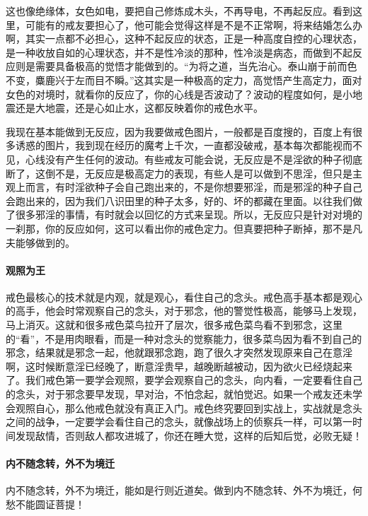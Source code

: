 这也像绝缘体，女色如电，要把自己修炼成木头，不再导电，不再起反应。看到这里，可能有的戒友要担心了，他可能会觉得这样是不是不正常啊，将来结婚怎么办啊，其实一点都不必担心，这种不起反应的状态，正是一种高度自控的心理状态，是一种收放自如的心理状态，并不是性冷淡的那种，性冷淡是病态，而做到不起反应则是需要具备极高的觉悟才能做到的。“为将之道，当先治心。泰山崩于前而色不变，麋鹿兴于左而目不瞬。”这其实是一种极高的定力，高觉悟产生高定力，面对女色的对境时，就看你的反应了，你的心线是否波动了？波动的程度如何，是小地震还是大地震，还是心如止水，这都反映着你的戒色水平。

我现在基本能做到无反应，因为我要做戒色图片，一般都是百度搜的，百度上有很多诱惑的图片，我到现在经历的魔考上千次，一直都没破戒，基本每次都能视而不见，心线没有产生任何的波动。有些戒友可能会说，无反应是不是淫欲的种子彻底断了，这倒不是，无反应是极高定力的表现，有些人是可以做到不思淫，但只是主观上而言，有时淫欲种子会自己跑出来的，不是你想要邪淫，而是邪淫的种子自己会跑出来的，因为我们八识田里的种子太多，好的、坏的都藏在里面。以往我们做了很多邪淫的事情，有时就会以回忆的方式来呈现。所以，无反应只是针对对境的一刹那，你的反应如何，这可以看出你的戒色定力。但真要把种子断掉，那不是凡夫能够做到的。

\paragraph{观照为王}

戒色最核心的技术就是内观，就是观心，看住自己的念头。戒色高手基本都是观心的高手，他会时常观察自己的念头，对于邪念，他的警觉性极高，能够马上发现，马上消灭。这就和很多戒色菜鸟拉开了层次，很多戒色菜鸟看不到邪念，这里的“看”，不是用肉眼看，而是一种对念头的觉察能力，很多菜鸟因为看不到自己的邪念，结果就是邪念一起，他就跟邪念跑，跑了很久才突然发现原来自己在意淫啊，这时候断意淫已经晚了，断意淫贵早，越晚断越被动，因为欲火已经烧起来了。我们戒色第一要学会观照，要学会观察自己的念头，向内看，一定要看住自己的念头，对于邪念要早发现，早对治，不怕念起，就怕觉迟。如果一个戒友还未学会观照自心，那么他戒色就没有真正入门。戒色终究要回到实战上，实战就是念头之间的战争，一定要学会看住自己的念头，就像战场上的侦察兵一样，可以第一时间发现敌情，否则敌人都攻进城了，你还在睡大觉，这样的后知后觉，必败无疑！

\paragraph{内不随念转，外不为境迁}

内不随念转，外不为境迁，能如是行则近道矣。做到内不随念转、外不为境迁，何愁不能圆证菩提！


